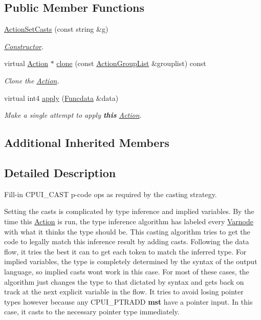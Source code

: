 \subsection*{Public Member Functions}
\begin{DoxyCompactItemize}
\item 
\mbox{\hyperlink{class_action_set_casts_abf39e01428d035f90fbcbafd5c06fd7c}{Action\+Set\+Casts}} (const string \&g)
\begin{DoxyCompactList}\small\item\em \mbox{\hyperlink{class_constructor}{Constructor}}. \end{DoxyCompactList}\item 
virtual \mbox{\hyperlink{class_action}{Action}} $\ast$ \mbox{\hyperlink{class_action_set_casts_abd5deebdb942e64993d2f321b4c1901e}{clone}} (const \mbox{\hyperlink{class_action_group_list}{Action\+Group\+List}} \&grouplist) const
\begin{DoxyCompactList}\small\item\em Clone the \mbox{\hyperlink{class_action}{Action}}. \end{DoxyCompactList}\item 
virtual int4 \mbox{\hyperlink{class_action_set_casts_a9999706f3347f707e39c28b5a208fbd3}{apply}} (\mbox{\hyperlink{class_funcdata}{Funcdata}} \&data)
\begin{DoxyCompactList}\small\item\em Make a single attempt to apply {\bfseries{this}} \mbox{\hyperlink{class_action}{Action}}. \end{DoxyCompactList}\end{DoxyCompactItemize}
\subsection*{Additional Inherited Members}


\subsection{Detailed Description}
Fill-\/in C\+P\+U\+I\+\_\+\+C\+A\+ST p-\/code ops as required by the casting strategy. 

Setting the casts is complicated by type inference and implied variables. By the time this \mbox{\hyperlink{class_action}{Action}} is run, the type inference algorithm has labeled every \mbox{\hyperlink{class_varnode}{Varnode}} with what it thinks the type should be. This casting algorithm tries to get the code to legally match this inference result by adding casts. Following the data flow, it tries the best it can to get each token to match the inferred type. For implied variables, the type is completely determined by the syntax of the output language, so implied casts won\textquotesingle{}t work in this case. For most of these cases, the algorithm just changes the type to that dictated by syntax and gets back on track at the next explicit variable in the flow. It tries to avoid losing pointer types however because any C\+P\+U\+I\+\_\+\+P\+T\+R\+A\+DD {\bfseries{mst}} have a pointer input. In this case, it casts to the necessary pointer type immediately. 

